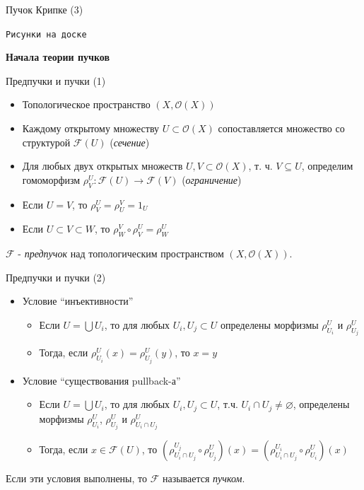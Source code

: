 \documentclass{beamer}
\begin{document}
\begin{frame}{Пучок Крипке (3)}
\begin{center}
	\texttt{Рисунки на доске}
\end{center}
\end{frame}

\begin{frame}{}
\begin{center}
	\textbf{Начала теории пучков}
\end{center}
\end{frame}

\begin{frame}{Предпучки и пучки (1)}
\begin{itemize}
	\item Топологическое пространство $(X, \mathcal{O}(X))$
	\item Каждому открытому множеству $U \subset \mathcal{O}(X)$ сопоставляется множество со структурой $\mathcal{F}(U)$ (\textit{сечение})
	\item Для любых двух открытых множеств $U, V \subset \mathcal{O}(X)$, т. ч. $V \subseteq U$, определим гомоморфизм $\rho^U_V : \mathcal{F}(U) \to \mathcal{F}(V)$ (\textit{ограничение})
	\item Если $U = V$, то $\rho^U_V = \rho^V_U = 1_U$
	\item Если $U \subset V \subset W$, то $\rho^V_W \circ \rho^U_V = \rho^U_W$
\end{itemize}
\bigskip
$\mathcal{F}$ - \textit{предпучок} над топологическим пространством $(X, \mathcal{O}(X))$.
\end{frame}

\begin{frame}{Предпучки и пучки (2)}
\begin{itemize}
	\item Условие ``инъективности''
		\bigskip
		\begin{itemize}
			\item Если $U = \bigcup U_i$, то для любых $U_i, U_j \subset U$ определены морфизмы $\rho^U_{U_i}$ и $\rho^U_{U_j}$
			\medskip
			\item Тогда, если $\rho^U_{U_i}(x) = \rho^U_{U_j}(y)$, то $x = y$
		\end{itemize}
	\bigskip
	\item Условие ``существования pullback-а''
		\bigskip
		\begin{itemize}
			\item Если $U = \bigcup U_i$, то для любых $U_i, U_j \subset U$, т.ч. $U_i \cap U_j \neq \varnothing$, определены морфизмы $\rho^U_{U_i}$, $\rho^U_{U_j}$ и $\rho^U_{U_i \cap U_j}$
			\medskip
			\item Тогда, если $x \in \mathcal{F}(U)$, то $(\rho^{U_j}_{U_i \cap U_j} \circ \rho^U_{U_j})(x) = (\rho^{U_i}_{U_i \cap U_j} \circ \rho^U_{U_i})(x)$
		\end{itemize}
\end{itemize}
\bigskip
Если эти условия выполнены, то $\mathcal{F}$ называется \textit{пучком}.
\end{frame}
\end{document}

